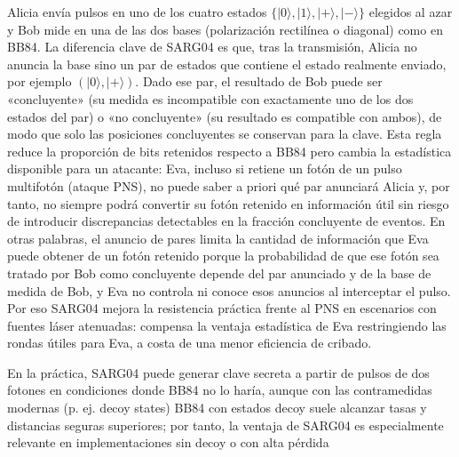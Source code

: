 Alicia envía pulsos en uno de los cuatro estados $\{|0\rangle,|1\rangle,|+\rangle,|-\rangle\}$ elegidos al azar y Bob mide en una de las dos bases (polarización rectilínea o diagonal) como en BB84. La diferencia clave de SARG04 es que, tras la transmisión, Alicia no anuncia la base sino un par de estados que contiene el estado realmente enviado, por ejemplo $(|0\rangle,|+\rangle)$. Dado ese par, el resultado de Bob puede ser «concluyente» (su medida es incompatible con exactamente uno de los dos estados del par) o «no concluyente» (su resultado es compatible con ambos), de modo que solo las posiciones concluyentes se conservan para la clave. Esta regla reduce la proporción de bits retenidos respecto a BB84 pero cambia la estadística disponible para un atacante: Eva, incluso si retiene un fotón de un pulso multifotón (ataque PNS), no puede saber a priori qué par anunciará Alicia y, por tanto, no siempre podrá convertir su fotón retenido en información útil sin riesgo de introducir discrepancias detectables en la fracción concluyente de eventos. En otras palabras, el anuncio de pares limita la cantidad de información que Eva puede obtener de un fotón retenido porque la probabilidad de que ese fotón sea tratado por Bob como concluyente depende del par anunciado y de la base de medida de Bob, y Eva no controla ni conoce esos anuncios al interceptar el pulso. Por eso SARG04 mejora la resistencia práctica frente al PNS en escenarios con fuentes láser atenuadas: compensa la ventaja estadística de Eva restringiendo las rondas útiles para Eva, a costa de una menor eficiencia de cribado.
\newline


En la práctica, SARG04 puede generar clave secreta a partir de pulsos de dos fotones en condiciones donde BB84 no lo haría, aunque con las contramedidas modernas (p. ej. decoy states) BB84 con estados decoy suele alcanzar tasas y distancias seguras superiores; por tanto, la ventaja de SARG04 es especialmente relevante en implementaciones sin decoy o con alta pérdida 
\newline


